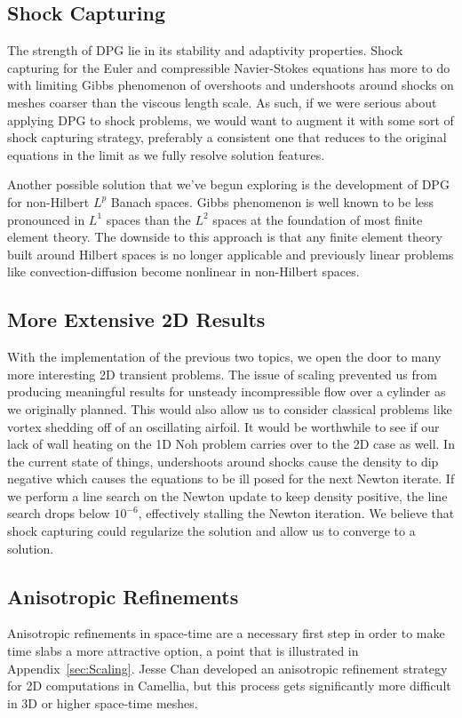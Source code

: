 \documentclass[Dissertation.tex]{subfiles}
\begin{document}
\subsection{Shock Capturing}
The strength of DPG lie in its stability and adaptivity properties. 
Shock capturing for the Euler and compressible Navier-Stokes equations has more to do with 
limiting Gibbs phenomenon of overshoots and undershoots around shocks on meshes coarser than
the viscous length scale.
As such, if we were serious about applying DPG to shock problems, we would want to augment it
with some sort of shock capturing strategy, preferably a consistent one that reduces to the original
equations in the limit as we fully resolve solution features.

Another possible solution that we've begun exploring is the development of DPG for non-Hilbert $L^p$
Banach spaces. 
Gibbs phenomenon is well known to be less pronounced in $L^1$ spaces than the $L^2$ spaces at
the foundation of most finite element theory.
The downside to this approach is that any finite element theory built around Hilbert spaces is no longer applicable
and previously linear problems like convection-diffusion become nonlinear in non-Hilbert spaces.

\subsection{More Extensive 2D Results}
With the implementation of the previous two topics, we open the door to many more interesting 2D 
transient problems.
The issue of scaling prevented us from producing meaningful results for unsteady incompressible
flow over a cylinder as we originally planned.
This would also allow us to consider classical problems like vortex shedding off of an oscillating
airfoil.
It would be worthwhile to see if our lack of wall heating on the 1D Noh problem carries over to the 
2D case as well. 
In the current state of things, undershoots around shocks cause the density to dip negative 
which causes the equations to be ill posed for the next Newton iterate. 
If we perform a line search on the Newton update to keep density positive, the line 
search drops below $10^{-6}$, effectively stalling the Newton iteration.
We believe that shock capturing could regularize the solution and allow us to converge to a solution.

\subsection{Anisotropic Refinements}
Anisotropic refinements in space-time are a necessary first step in order to make
time slabs a more attractive option, a point that is illustrated in Appendix~\ref{sec:Scaling}.
Jesse Chan developed an anisotropic refinement strategy for 2D computations in Camellia, 
but this process gets significantly more difficult in 3D or higher space-time meshes.
\end{document}
